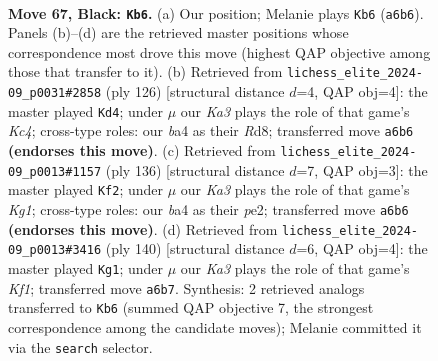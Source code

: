 \documentclass[11pt]{article}
\begin{document}
\clearpage

\begin{figure}[p]\centering
\begin{subfigure}{0.46\textwidth}\centering
\resizebox{\linewidth}{!}{%
\newchessgame
\chessboard[
  setfen={8/8/k7/5R2/B4P2/4K3/7P/8 b - - 0 67},
  showmover=false,
  pgfstyle=straightmove, color=movearrow, markmove={a6-b6}
]}
\caption{}
\end{subfigure}\hfill
\begin{subfigure}{0.46\textwidth}\centering
\resizebox{\linewidth}{!}{%
\newchessgame
\chessboard[
  setfen={3R4/8/8/5k2/2K3p1/6r1/8/8 w - - 0 64},
  showmover=false,
  pgfstyle=straightmove, color=movearrow, markmove={c4-d4}
]}
\caption{}
\end{subfigure}
\\[4pt]
\begin{subfigure}{0.46\textwidth}\centering
\resizebox{\linewidth}{!}{%
\newchessgame
\chessboard[
  setfen={8/8/4p3/8/5k2/2p5/2r1p3/6K1 w - - 0 69},
  showmover=false,
  pgfstyle=straightmove, color=movearrow, markmove={g1-f2}
]}
\caption{}
\end{subfigure}\hfill
\begin{subfigure}{0.46\textwidth}\centering
\resizebox{\linewidth}{!}{%
\newchessgame
\chessboard[
  setfen={8/8/8/8/2k5/2p5/2r5/5K2 w - - 8 71},
  showmover=false,
  pgfstyle=straightmove, color=movearrow, markmove={f1-g1}
]}
\caption{}
\end{subfigure}
\caption{\textbf{Move 67, Black: \texttt{Kb6}.} (a) Our position; Melanie plays \texttt{Kb6} (\texttt{a6b6}). Panels (b)--(d) are the retrieved master positions whose correspondence most drove this move (highest QAP objective among those that transfer to it). (b) Retrieved from \texttt{lichess\_elite\_2024-09\_p0031\#2858} (ply 126) [structural distance $d$=4, QAP obj=4]: the master played \texttt{Kd4}; under $\mu$ our \emph{Ka3} plays the role of that game's \emph{Kc4}; cross-type roles: our \emph{b}a4 as their \emph{R}d8; transferred move \texttt{a6b6} \textbf{(endorses this move)}. (c) Retrieved from \texttt{lichess\_elite\_2024-09\_p0013\#1157} (ply 136) [structural distance $d$=7, QAP obj=3]: the master played \texttt{Kf2}; under $\mu$ our \emph{Ka3} plays the role of that game's \emph{Kg1}; cross-type roles: our \emph{b}a4 as their \emph{p}e2; transferred move \texttt{a6b6} \textbf{(endorses this move)}. (d) Retrieved from \texttt{lichess\_elite\_2024-09\_p0013\#3416} (ply 140) [structural distance $d$=6, QAP obj=4]: the master played \texttt{Kg1}; under $\mu$ our \emph{Ka3} plays the role of that game's \emph{Kf1}; transferred move \texttt{a6b7}. Synthesis: 2 retrieved analogs transferred to \texttt{Kb6} (summed QAP objective 7, the strongest correspondence among the candidate moves); Melanie committed it via the \texttt{search} selector.}
\label{fig:thought-m133}
\end{figure}
\end{document}
